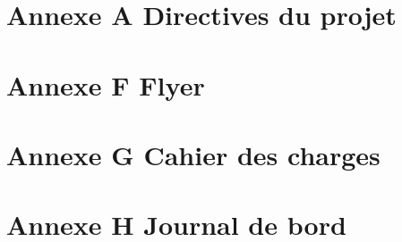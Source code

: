 \documentclass[12pt,a4paper,twoside]{report}
\begin{document}
\cleardoublepage
\chapter*{Annexe A \- Directives du projet}
\cleardoublepage
\chapter*{Annexe F \- Flyer}
\cleardoublepage
\chapter*{Annexe G \- Cahier des charges}

\cleardoublepage
\chapter*{Annexe H \- Journal de bord}


%

%
\end{document}
